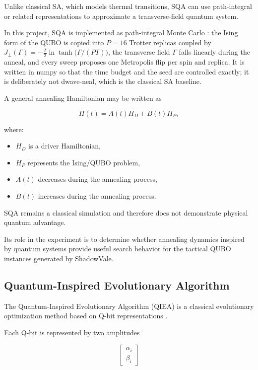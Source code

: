 \documentclass[12pt, a4paper]{article}
\begin{document}
Unlike classical SA, which models thermal transitions, SQA can use path-integral or related representations to approximate a transverse-field quantum system.

In this project, SQA is implemented as path-integral Monte Carlo \cite{Martonak2002}: the Ising form of the QUBO is copied into $P = 16$ Trotter replicas coupled by $J_\perp(\Gamma) = -\tfrac{T}{2}\ln\tanh\!\big(\Gamma/(PT)\big)$, the transverse field $\Gamma$ falls linearly during the anneal, and every sweep proposes one Metropolis flip per spin and replica. It is written in numpy so that the time budget and the seed are controlled exactly; it is deliberately not dwave-neal, which is the classical SA baseline.

A general annealing Hamiltonian may be written as

$$
H(t)
=
A(t)H_D
+
B(t)H_P,
$$

where:

\begin{itemize}
\item $H_D$ is a driver Hamiltonian,
\item $H_P$ represents the Ising/QUBO problem,
\item $A(t)$ decreases during the annealing process,
\item $B(t)$ increases during the annealing process.
\end{itemize}

SQA remains a classical simulation and therefore does not demonstrate physical quantum advantage.

Its role in the experiment is to determine whether annealing dynamics inspired by quantum systems provide useful search behavior for the tactical QUBO instances generated by ShadowVale.

\subsection*{Quantum-Inspired Evolutionary Algorithm}

The Quantum-Inspired Evolutionary Algorithm (QIEA) is a classical evolutionary optimization method based on Q-bit representations \cite{HanKim2002}.

Each Q-bit is represented by two amplitudes

$$
\begin{bmatrix}
\alpha_i\\
\beta_i
\end{bmatrix}
$$
\end{document}
